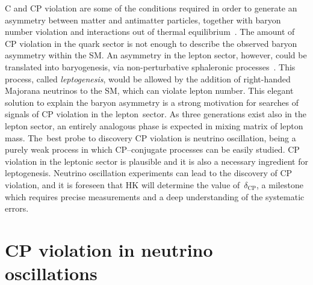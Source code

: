 C and CP violation are some of the conditions required in order to generate %
an asymmetry between matter and antimatter particles, together with %
baryon number violation and interactions out of thermal equilibrium~\cite{Sakharov:1967dj}.
The amount of CP violation in the quark sector is not enough %
to describe the observed baryon asymmetry within the SM.
An asymmetry in the lepton sector, however, could be translated into baryogenesis, %
via non-perturbative sphaleronic processes~\cite{Fukugita:1986hr}.
This process, called \emph{leptogenesis}, would be allowed by the addition of %
right-handed Majorana neutrinos to the SM, which can violate lepton number.
This elegant solution to explain the baryon asymmetry is a strong motivation %
for searches of signals of CP violation in the lepton~sector.
As three generations exist also in the lepton sector, %
an entirely analogous phase is expected in mixing matrix of lepton mass.
The~best probe to discovery CP violation is neutrino oscillation, being a purely weak process in which %
CP--conjugate processes can be easily studied.
CP violation in the leptonic sector is plausible and it is also a necessary ingredient for leptogenesis.
Neutrino oscillation experiments can lead to the discovery of CP violation, and it is %
foreseen that HK will determine the value of~$\delta_\text{CP}$, %
a milestone which requires precise measurements and a deep understanding of the systematic errors.


\section{CP violation in neutrino oscillations}
\label{sec:cp_oscillation}


